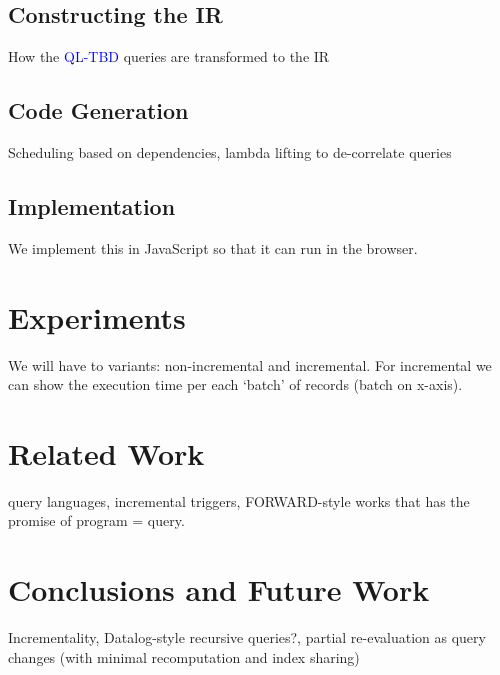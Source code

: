 \documentclass[runningheads]{llncs}
\newcommand{\lang}{\textcolor{blue}{QL-TBD}}
\begin{document}

\subsection{Constructing the IR}
How the \lang{} queries are transformed to the IR

\subsection{Code Generation}
Scheduling based on dependencies, lambda lifting to de-correlate queries

\subsection{Implementation}
We implement this in JavaScript so that it can run in the browser.





\section{Experiments}\label{sec:experiments}
We will have to variants: non-incremental and incremental.
For incremental we can show the execution time per each `batch' of
records (batch on x-axis).


\section{Related Work}\label{sec:related_work}
query languages, incremental triggers, FORWARD-style works that has the promise
of program = query.


\section{Conclusions and Future Work}\label{sec:conclusions}
Incrementality, Datalog-style recursive queries?, partial re-evaluation as
query changes (with minimal recomputation and index sharing)
%
%



\end{document}

